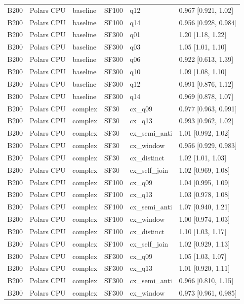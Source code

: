 \begin{longtable}{llllll}
B200 & Polars CPU & baseline & SF100 & q12 & 0.967 [0.921, 1.02] \\
B200 & Polars CPU & baseline & SF100 & q14 & 0.956 [0.928, 0.984] \\
B200 & Polars CPU & baseline & SF300 & q01 & 1.20 [1.18, 1.22] \\
B200 & Polars CPU & baseline & SF300 & q03 & 1.05 [1.01, 1.10] \\
B200 & Polars CPU & baseline & SF300 & q06 & 0.922 [0.613, 1.39] \\
B200 & Polars CPU & baseline & SF300 & q10 & 1.09 [1.08, 1.10] \\
B200 & Polars CPU & baseline & SF300 & q12 & 0.991 [0.876, 1.12] \\
B200 & Polars CPU & baseline & SF300 & q14 & 0.969 [0.878, 1.07] \\
B200 & Polars CPU & complex & SF30 & cx\_q09 & 0.977 [0.963, 0.991] \\
B200 & Polars CPU & complex & SF30 & cx\_q13 & 0.993 [0.962, 1.02] \\
B200 & Polars CPU & complex & SF30 & cx\_semi\_anti & 1.01 [0.992, 1.02] \\
B200 & Polars CPU & complex & SF30 & cx\_window & 0.956 [0.929, 0.983] \\
B200 & Polars CPU & complex & SF30 & cx\_distinct & 1.02 [1.01, 1.03] \\
B200 & Polars CPU & complex & SF30 & cx\_self\_join & 1.02 [0.969, 1.08] \\
B200 & Polars CPU & complex & SF100 & cx\_q09 & 1.04 [0.995, 1.09] \\
B200 & Polars CPU & complex & SF100 & cx\_q13 & 1.03 [0.978, 1.08] \\
B200 & Polars CPU & complex & SF100 & cx\_semi\_anti & 1.07 [0.940, 1.21] \\
B200 & Polars CPU & complex & SF100 & cx\_window & 1.00 [0.974, 1.03] \\
B200 & Polars CPU & complex & SF100 & cx\_distinct & 1.10 [1.03, 1.17] \\
B200 & Polars CPU & complex & SF100 & cx\_self\_join & 1.02 [0.929, 1.13] \\
B200 & Polars CPU & complex & SF300 & cx\_q09 & 1.05 [1.03, 1.07] \\
B200 & Polars CPU & complex & SF300 & cx\_q13 & 1.01 [0.920, 1.11] \\
B200 & Polars CPU & complex & SF300 & cx\_semi\_anti & 0.966 [0.810, 1.15] \\
B200 & Polars CPU & complex & SF300 & cx\_window & 0.973 [0.961, 0.985] \\

\end{longtable}
